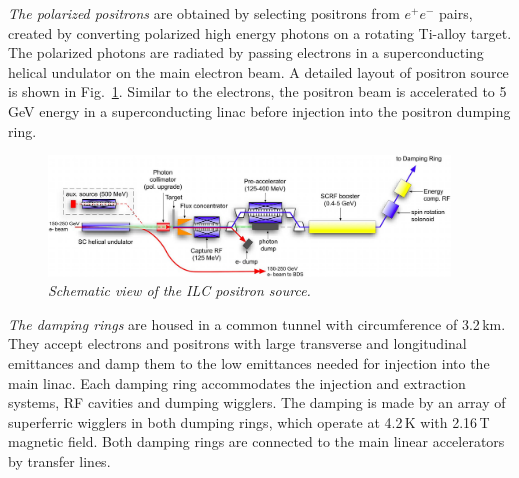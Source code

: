 \textit{The polarized positrons} are obtained by selecting positrons from $e^+ e^-$ pairs, created by converting polarized high energy photons on a rotating Ti-alloy target. The polarized photons are radiated by passing electrons in a superconducting helical undulator on the main electron beam.
A detailed layout of positron source is shown in Fig.~\ref{fig:ILCeplus}.
Similar to the electrons, the positron beam is accelerated to 5\,GeV energy in a superconducting linac before injection into the positron dumping ring. 

\begin{figure}
{\centering
    \includegraphics[width=0.95\textwidth]{graphics/ILCeplus.jpg}
    \caption{\sl Schematic view of the ILC positron source.}
    \label{fig:ILCeplus}
  }
\end{figure}

\textit{The damping rings} are housed in a common tunnel with circumference of 3.2\,km. They accept electrons and positrons with large transverse and longitudinal emittances and damp them to the low emittances needed for injection into the main linac. 
Each damping ring accommodates the injection and extraction systems, RF cavities and dumping wigglers.
The damping is made by an array of superferric wigglers in both dumping rings, which operate at 4.2\,K with 2.16\,T magnetic field. 
Both damping rings are connected to the main linear accelerators by transfer lines.

